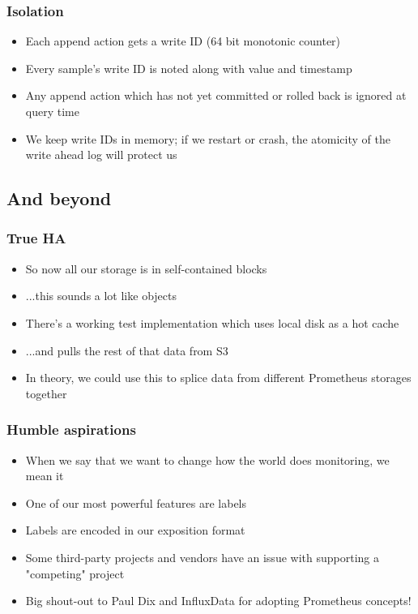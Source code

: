 \documentclass[t]{beamer}
\begin{document}
\begin{frame}
	\frametitle{Isolation}
	\begin{itemize}
		\item Each append action gets a write ID (64 bit monotonic counter)
		\item Every sample's write ID is noted along with value and timestamp
		\item Any append action which has not yet committed or rolled back is ignored at query time
		\item We keep write IDs in memory; if we restart or crash, the atomicity of the write ahead log will protect us
	\end{itemize}
\end{frame}


\subsection{And beyond}

\begin{frame}
	\frametitle{True HA}
	\begin{itemize}
		\item So now all our storage is in self-contained blocks
		\item ...this sounds a lot like objects
		\item There's a working test implementation which uses local disk as a hot cache
		\item ...and pulls the rest of that data from S3
		\item In theory, we could use this to splice data from different Prometheus storages together
	\end{itemize}
\end{frame}

\begin{frame}
	\frametitle{Humble aspirations}
	\begin{itemize}
		\item When we say that we want to change how the world does monitoring, we mean it
		\item One of our most powerful features are labels
		\item Labels are encoded in our exposition format
		\item Some third-party projects and vendors have an issue with supporting a "competing" project
		\item Big shout-out to Paul Dix and InfluxData for adopting Prometheus concepts!
	\end{itemize}
\end{frame}
\end{document}

